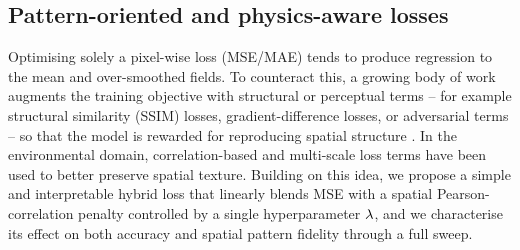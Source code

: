 \subsection{Pattern-oriented and physics-aware losses}

Optimising solely a pixel-wise loss (MSE/MAE) tends to produce regression to
the mean and over-smoothed fields. To counteract this, a growing body of work
augments the training objective with structural or perceptual terms -- for
example structural similarity (SSIM) losses, gradient-difference losses, or
adversarial terms -- so that the model is rewarded for reproducing spatial
structure \citep{zhao2017}. In the environmental domain, correlation-based and
multi-scale loss terms have been used to better preserve spatial texture.
Building on this idea, we propose a simple and interpretable hybrid loss that
linearly blends MSE with a spatial Pearson-correlation penalty controlled by a
single hyperparameter $\lambda$, and we characterise its effect on both
accuracy and spatial pattern fidelity through a full sweep.
